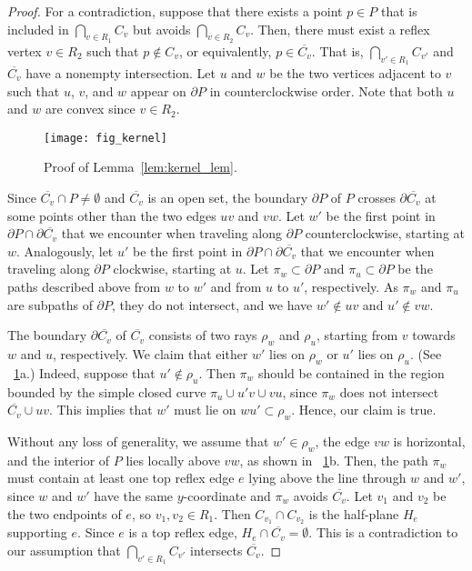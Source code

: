 \documentclass[11pt]{article}
\newcommand{\bd}{\ensuremath{\partial}}
\theoremstyle{definition}
\begin{document}
\begin{proof}
For a contradiction, suppose that there exists a point $p \in P$ that is included in
$\bigcap_{v\in R_1}C_v$ but avoids $\bigcap_{v\in R_2}C_v$.
Then, there must exist a reflex vertex $v\in R_2$ such that $p \notin C_v$,
or equivalently, $p \in \overline{C_v}$.
That is, $\bigcap_{v'\in R_1}C_{v'}$ and $\overline{C_v}$ have a nonempty intersection.
Let $u$ and $w$ be the two vertices adjacent to $v$ such that $u$, $v$, and $w$ appear
on $\bd P$ in counterclockwise order.
Note that both $u$ and $w$ are convex since $v\in R_2$.


\begin{figure}[tb]
\centering
\texttt{[image: fig\_kernel]}
\caption{Proof of Lemma~\ref{lem:kernel_lem}.}
\label{fig:kernel}
\end{figure}

Since $\overline{C_v} \cap P \neq \emptyset$ and $\overline{C_v}$ is an open set,
the boundary $\bd P$ of $P$ crosses $\bd \overline{C_v}$ at some points other than the two edges $uv$ and $vw$.
Let $w'$ be the first point in $\bd P \cap \bd \overline{C_v}$
that we encounter when traveling along $\bd P$ counterclockwise, starting at $w$.
Analogously, let $u'$ be the first point in $\bd P \cap \bd \overline{C_v}$
that we encounter when traveling along $\bd P$ clockwise, starting at $u$.
Let $\pi_w\subset \bd P$ and $\pi_u\subset \bd P$ be the paths described above
from $w$ to $w'$ and from $u$ to $u'$, respectively.
As  $\pi_w$ and $\pi_u$ are subpaths of $\bd P$, they do not intersect,
and we have $w' \notin uv$ and $u' \notin vw$.

The boundary $\bd \overline{C_v}$ of $\overline{C_v}$ consists of two rays $\rho_w$ and $\rho_u$,
starting from $v$ towards $w$ and $u$, respectively.
We claim that either $w'$ lies on $\rho_w$ or $u'$ lies on $\rho_u$.
(See \figurename~\ref{fig:kernel}a.) 
Indeed, suppose that $u' \notin \rho_u$.
Then $\pi_w$ should be contained in the region bounded by the simple closed curve
$\pi_u \cup u'v \cup vu$, since $\pi_w$ does not intersect $\overline{C_v} \cup uv$.
This implies that $w'$ must lie on $wu' \subset \rho_w$.
Hence, our claim is true.

Without any loss of generality, we assume that $w'\in \rho_w$,
the edge $vw$ is horizontal, and the interior of $P$ lies locally above $vw$,
as shown in \figurename~\ref{fig:kernel}b.
Then, the path $\pi_w$ must contain at least one top reflex edge $e$ lying above
the line through $w$ and $w'$,
since $w$ and $w'$ have the same $y$-coordinate and $\pi_w$ avoids $\overline{C_v}$.
Let $v_1$ and $v_2$ be the two endpoints of $e$,
so $v_1, v_2 \in R_1$.
Then $C_{v_1} \cap C_{v_2}$ is the half-plane $H_e$ supporting $e$.
Since $e$ is a top reflex edge, $H_e \cap \overline{C_v} = \emptyset$.
This is a contradiction to our assumption that $\bigcap_{v'\in R_1} C_{v'}$ intersects $\overline{C_v}$.
\end{proof}
\end{document}
